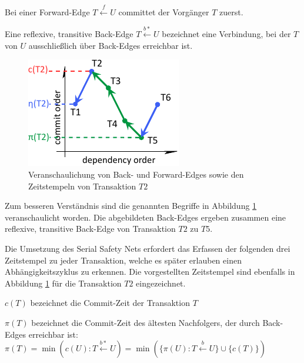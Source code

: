 \begin{Definition}
	Bei einer \textcolor{my-blue}{Forward-Edge} $T\xleftarrow{f} U$ committet der Vorgänger $T$ zuerst.
\end{Definition}

\begin{Definition}
	Eine reflexive, transitive \textcolor{my-green}{Back-Edge} $T\xleftarrow{b*} U$ bezeichnet eine Verbindung, bei der $T$ von $U$ ausschließlich über Back-Edges erreichbar ist.
\end{Definition}

\begin{figure}
	\includegraphics{img/Figure_2_1.pdf}
	\caption{Veranschaulichung von \textcolor{my-green}{Back}- und \textcolor{my-blue}{Forward-Edges} sowie den Zeitstempeln von Transaktion $T2$}
	\label{fig:back_forward}
\end{figure}

Zum besseren Verständnis sind die genannten Begriffe in Abbildung \ref{fig:back_forward} veranschaulicht worden.
Die abgebildeten Back-Edges ergeben zusammen eine reflexive, transitive Back-Edge von Transaktion $T2$ zu $T5$.

Die Umsetzung des Serial Safety Nets erfordert das Erfassen der folgenden drei Zeitstempel zu jeder Transaktion, welche es später erlauben einen Abhängigkeitszyklus zu erkennen.
Die vorgestellten Zeitstempel sind ebenfalls in Abbildung \ref{fig:back_forward} für die Transaktion $T2$ eingezeichnet.

\begin{Definition}
	\textcolor{my-red}{$c(T)$} bezeichnet die Commit-Zeit der Transaktion $T$
\end{Definition}

\begin{Definition}
	\textcolor{my-green}{$\pi (T)$} bezeichnet die Commit-Zeit des ältesten Nachfolgers, der durch Back-Edges erreichbar ist:\\		
	$\pi (T)=\min (c(U):T\xleftarrow{b*}U)=\min (\{\pi (U):T\xleftarrow{b}U\}\cup \{c(T)\})$
\end{Definition}

